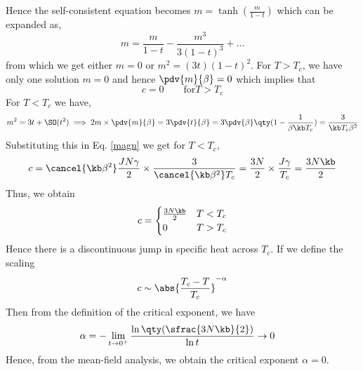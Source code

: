 Hence the self-consistent equation becomes $m = \tanh(\frac{m}{1-t})$ which can be expanded as,
\begin{equation}
    m = \frac{m}{1-t} -\frac{m^3}{3(1-t)^3}+\ldots
\end{equation}
from which we get either $m=0$ or $m^2=(3t)(1-t)^2$. For $T>T_c$, we have only one solution $m=0$ and hence $\pdv{m}{\beta}=0$ which implies that 
\begin{equation}
    c= 0 \qquad \text{for} T>T_c
\end{equation}
For $T<T_c$ we have, 
$$m^2 = 3t + \SO(t^2) \implies 2m \times \pdv{m}{\beta} = 3\pdv{t}{\beta} = 3\pdv{\beta}\qty(1-\frac{1}{\beta \kb T_c}) = \frac{3}{\kb T_c \beta^2}$$
Substituting this in Eq. \eqref{magn} we get for $T<T_c$,
\begin{equation}
    c = \cancel{\kb \beta^2} \frac{J N \gamma}{2} \times \frac{3}{\cancel{\kb  \beta^2} T_c} = \frac{3N}{2}\times \frac{J\gamma}{T_c} = \frac{3N\kb}{2}
\end{equation}
Thus, we obtain 
\begin{equation}
   c=  \begin{cases}
        \frac{3N\kb}{2} & T<T_c \\
        0 & T>T_c
    \end{cases}
\end{equation}
Hence there is a discontinuous jump in specific heat across $T_c$. If we define the scaling $$c\sim \abs{\frac{T_c-T}{T_c}}^{-\alpha}$$ Then from the definition of the critical exponent, we have 
\begin{equation}
    \alpha = - \lim\limits_{t\to 0^+} \frac{\ln \qty(\sfrac{3N\kb }{2})}{\ln t} \rightarrow 0 \quad
\end{equation}
Hence, from the mean-field analysis, we obtain the critical exponent $\alpha=0$.